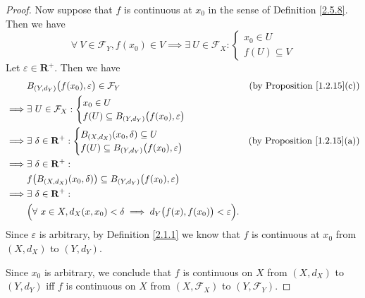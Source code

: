 \begin{proof}
    Now suppose that \(f\) is continuous at \(x_0\) in the sense of Definition \ref{2.5.8}.
    Then we have
    \[
        \forall\ V \in \mathcal{F}_Y, f(x_0) \in V \implies \exists\ U \in \mathcal{F}_X : \begin{cases}
            x_0 \in U \\
            f(U) \subseteq V
        \end{cases}
    \]
    Let \(\varepsilon \in \mathbf{R}^+\).
    Then we have
    \begin{align*}
                 & B_{(Y, d_Y)}\big(f(x_0), \varepsilon\big) \in \mathcal{F}_Y                                        & \text{(by Proposition \ref{1.2.15}(c))} \\
        \implies & \exists\ U \in \mathcal{F}_X : \begin{cases}
            x_0 \in U \\
            f(U) \subseteq B_{(Y, d_Y)}\big(f(x_0), \varepsilon\big)
        \end{cases}                                                                                   \\
        \implies & \exists\ \delta \in \mathbf{R}^+ : \begin{cases}
            B_{(X, d_X)}(x_0, \delta) \subseteq U \\
            f(U) \subseteq B_{(Y, d_Y)}\big(f(x_0), \varepsilon\big)
        \end{cases}                                     & \text{(by Proposition \ref{1.2.15}(a))} \\
        \implies & \exists\ \delta \in \mathbf{R}^+ :                                                                                                           \\
                 & f\big(B_{(X, d_X)}(x_0, \delta)\big) \subseteq B_{(Y, d_Y)}\big(f(x_0), \varepsilon\big)                                                     \\
        \implies & \exists\ \delta \in \mathbf{R}^+ :                                                                                                           \\
                 & \Big(\forall\ x \in X, d_X(x, x_0) < \delta \implies d_Y\big(f(x), f(x_0)\big) < \varepsilon\Big).
    \end{align*}
    Since \(\varepsilon\) is arbitrary, by Definition \ref{2.1.1} we know that \(f\) is continuous at \(x_0\) from \((X, d_X)\) to \((Y, d_Y)\).

    Since \(x_0\) is arbitrary, we conclude that \(f\) is continuous on \(X\) from \((X, d_X)\) to \((Y, d_Y)\) iff \(f\) is continuous on \(X\) from \((X, \mathcal{F}_X)\) to \((Y, \mathcal{F}_Y)\).
\end{proof}

